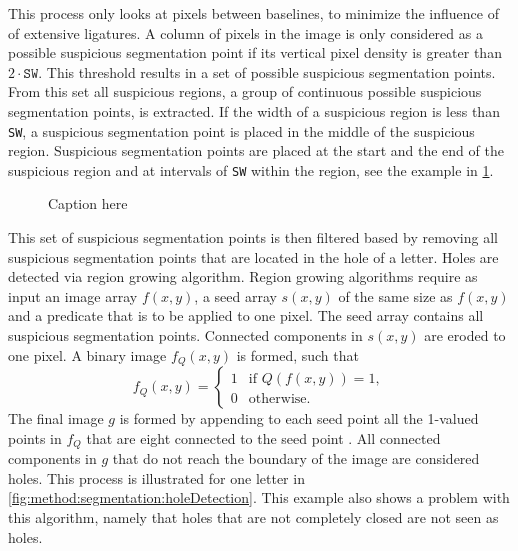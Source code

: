 	This process only looks at pixels between baselines, to minimize the influence of of extensive ligatures. A column of pixels in the image is only considered as a possible suspicious segmentation point if its vertical pixel density is greater than $2 \cdot \mathtt{SW}$. This threshold results in a set of possible suspicious segmentation points. From this set all suspicious regions, a group of continuous possible suspicious segmentation points, is extracted. If the width of a suspicious region is less than \texttt{SW}, a suspicious segmentation point is placed in the middle of the suspicious region. Suspicious segmentation points are placed at the start and the end of the suspicious region and at intervals of \texttt{SW} within the region, see the example in \cref{fig:method:segmentation:suspiciousSegmentationPoints}.

	\begin{figure}
		\centering
		\caption{Caption here}
		\label{fig:method:segmentation:suspiciousSegmentationPoints}
	\end{figure}

	This set of suspicious segmentation points is then filtered based by removing all suspicious segmentation points that are located in the hole of a letter. Holes are detected via region growing algorithm. Region growing algorithms require as input an image array $f(x,y)$, a seed array $s(x,y)$ of the same size as $f(x,y)$ and a predicate that is to be applied to one pixel. The seed array contains all suspicious segmentation points. Connected components in $s(x,y)$ are eroded to one pixel. A binary image $f_Q(x,y)$ is formed, such that
	\begin{equation*}
		f_Q(x,y) = 
		\begin{cases}
			1 & \text{if }Q(f(x,y)) = 1,\\
			0 & \text{otherwise.}
		\end{cases}
	\end{equation*}
	The final image $g$ is formed by appending to each seed point all the 1-valued points in $f_Q$ that are eight connected to the seed point \cite{gonzalez2002digitalCh10}. All connected components in $g$ that do not reach the boundary of the image are considered holes. This process is illustrated for one letter in \cref{fig:method:segmentation:holeDetection}. This example also shows a problem with this algorithm, namely that holes that are not completely closed are not seen as holes. 


